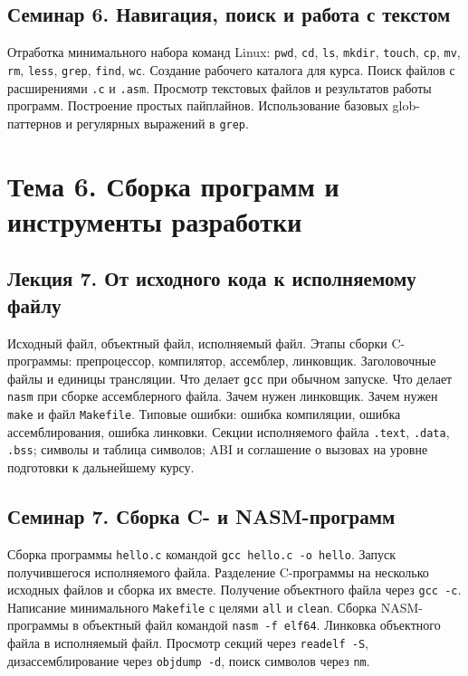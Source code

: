 \documentclass[a4paper,14pt]{extreport}
\begin{document}
\subsection*{Семинар 6. Навигация, поиск и работа с текстом}

Отработка минимального набора команд Linux: \texttt{pwd}, \texttt{cd}, \texttt{ls}, \texttt{mkdir}, \texttt{touch}, \texttt{cp}, \texttt{mv}, \texttt{rm}, \texttt{less}, \texttt{grep}, \texttt{find}, \texttt{wc}. Создание рабочего каталога для курса. Поиск файлов с расширениями \texttt{.c} и \texttt{.asm}. Просмотр текстовых файлов и результатов работы программ. Построение простых пайплайнов. Использование базовых glob-паттернов и регулярных выражений в \texttt{grep}.

\section{Тема 6. Сборка программ и инструменты разработки}

\subsection*{Лекция 7. От исходного кода к исполняемому файлу}

Исходный файл, объектный файл, исполняемый файл. Этапы сборки C-программы: препроцессор, компилятор, ассемблер, линковщик. Заголовочные файлы и единицы трансляции. Что делает \texttt{gcc} при обычном запуске. Что делает \texttt{nasm} при сборке ассемблерного файла. Зачем нужен линковщик. Зачем нужен \texttt{make} и файл \texttt{Makefile}. Типовые ошибки: ошибка компиляции, ошибка ассемблирования, ошибка линковки. Секции исполняемого файла \texttt{.text}, \texttt{.data}, \texttt{.bss}; символы и таблица символов; ABI и соглашение о вызовах на уровне подготовки к дальнейшему курсу.

\subsection*{Семинар 7. Сборка C- и NASM-программ}

Сборка программы \texttt{hello.c} командой \texttt{gcc hello.c -o hello}. Запуск получившегося исполняемого файла. Разделение C-программы на несколько исходных файлов и сборка их вместе. Получение объектного файла через \texttt{gcc -c}. Написание минимального \texttt{Makefile} с целями \texttt{all} и \texttt{clean}. Сборка NASM-программы в объектный файл командой \texttt{nasm -f elf64}. Линковка объектного файла в исполняемый файл. Просмотр секций через \texttt{readelf -S}, дизассемблирование через \texttt{objdump -d}, поиск символов через \texttt{nm}.
\end{document}
